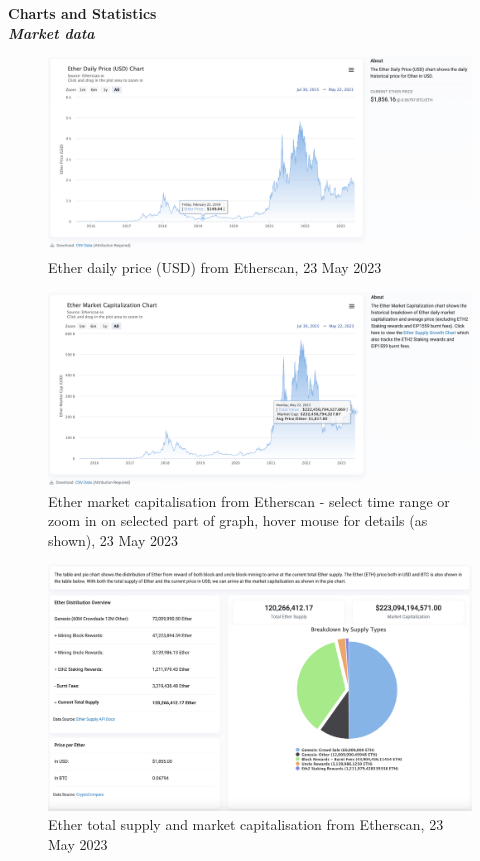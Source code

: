 \documentclass[UTF8]{article}
\begin{document}
{\clearpage
\textbf{Charts and Statistics}\\
\textit{\textbf{Market data}}
\begin{figure}[htbp]
\begin{center}
\includegraphics[width=0.9\linewidth]{images/ethdaily}
\caption{Ether daily price (USD) from Etherscan, 23 May 2023}
\label{fig:ethdaily}
\end{center}
\end{figure}

\begin{figure}[htbp]
\begin{center}
\includegraphics[width=0.9\linewidth]{images/marketcap}
\caption{Ether market capitalisation from Etherscan  - select time range or zoom in on selected part of graph, hover mouse for details (as shown), 23 May 2023}
\label{fig:marketcap}
\end{center}
\end{figure}

\begin{figure}[htbp]
\begin{center}
\includegraphics[width=0.9\linewidth]{images/totcap}
\caption{Ether total supply and market capitalisation from Etherscan, 23 May 2023}
\label{fig:totcap}
\end{center}
\end{figure}

}
\end{document}
